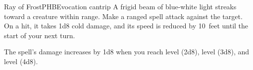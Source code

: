 \begin{spell}{Ray of Frost}{PHB}{Evocation cantrip}
{
}
A frigid beam of blue-white light streaks toward a
creature within range. Make a ranged spell attack
against the target. On a hit, it takes 1d8 cold damage,
and its speed is reduced by 10~feet until the start of
your next turn.

The spell's damage increases by 1d8 when you reach
 level (2d8),  level (3d8), and  level (4d8).
\end{spell}